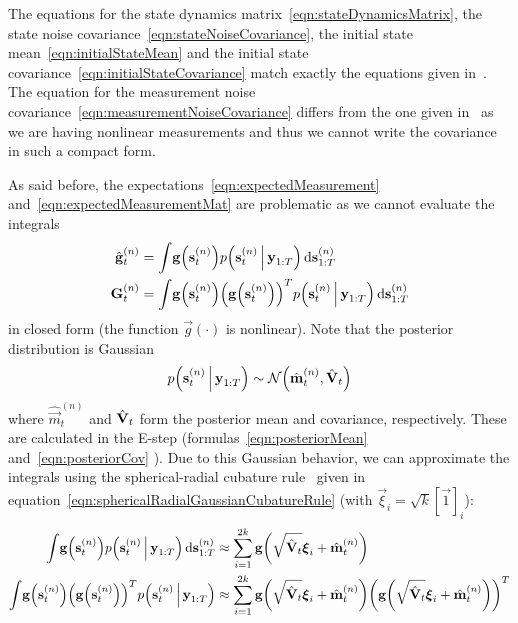 	The equations for the state dynamics matrix~\ref{eqn:stateDynamicsMatrix}, the state noise covariance~\ref{eqn:stateNoiseCovariance}, the initial state mean~\ref{eqn:initialStateMean} and the initial state covariance~\ref{eqn:initialStateCovariance} match exactly the equations given in~\cite{ghahramaniParameterEstimationLinear1996}. The equation for the measurement noise covariance~\ref{eqn:measurementNoiseCovariance} differs from the one given in~\cite{ghahramaniParameterEstimationLinear1996} as we are having nonlinear measurements and thus we cannot write the covariance in such a compact form.
	
	As said before, the expectations~\ref{eqn:expectedMeasurement} and~\ref{eqn:expectedMeasurementMat} are problematic as we cannot evaluate the integrals
	\begin{align*}
		\hat{\boldsymbol{\mathrm{g}}}_t^{(n)} &= \int\! \boldsymbol{\mathrm{g}}\Big(\boldsymbol{\mathrm{s}}_t^{(n)}\Big) p\Big(\boldsymbol{\mathrm{s}}_t^{(n)} \,\Big\vert\, \boldsymbol{\mathrm{y}}_{1:T}\Big) \dd{\boldsymbol{\mathrm{s}}_{1:T}^{(n)}} \\
		\boldsymbol{\mathrm{G}}_t^{(n)}       &= \int\! \boldsymbol{\mathrm{g}}\Big(\boldsymbol{\mathrm{s}}_t^{(n)}\Big) \Big(\boldsymbol{\mathrm{g}}\Big(\boldsymbol{\mathrm{s}}_t^{(n)}\Big)\Big)^T p\Big(\boldsymbol{\mathrm{s}}_t^{(n)} \,\Big\vert\, \boldsymbol{\mathrm{y}}_{1:T} \Big) \dd{\boldsymbol{\mathrm{s}}_{1:T}^{(n)}}
	\end{align*}
	in closed form (the function \( \vec{g}(\cdot) \) is nonlinear). Note that the posterior distribution is Gaussian
	\begin{equation*} %
		p\Big(\vec{s}_t^{(n)} \Biggiven \vec{y}_{1:T}\Big) \sim \normal\Big(\hat{\vec{m}}_t^{(n)}, \hat{\mat{V}}_t\Big)
	\end{equation*}
	where \( \hat{\vec{m}}_t^{(n)} \) and \( \hat{\boldsymbol{\mathrm{V}}}_t \) form the posterior mean and covariance, respectively. These are calculated in the E-step (formulas~\ref{eqn:posteriorMean} and~\ref{eqn:posteriorCov} ). Due to this Gaussian behavior, we can approximate the integrals using the spherical-radial cubature rule~\cite{solinCubatureIntegrationMethods2010} given in equation~\ref{eqn:sphericalRadialGaussianCubatureRule} (with \( \vec{\xi}_i = \sqrt{k} [\vec{1}]_i \)):
	\begin{align}
		\int\! \boldsymbol{\mathrm{g}}\Big(\boldsymbol{\mathrm{s}}_t^{(n)}\Big) p\Big(\boldsymbol{\mathrm{s}}_t^{(n)} \,\Big\vert\, \boldsymbol{\mathrm{y}}_{1:T}\Big) \dd{\boldsymbol{\mathrm{s}}_{1:T}^{(n)}}
			&\approx \sum_{i = 1}^{2k} \boldsymbol{\mathrm{g}}\bigg(\sqrt{\hat{\boldsymbol{\mathrm{V}}}_t} \boldsymbol{\mathrm{\xi}}_i + \hat{\boldsymbol{\mathrm{m}}}_t^{(n)}\bigg)  \label{eqn:lgsCubatureG} \\
		\int\! \boldsymbol{\mathrm{g}}\Big(\boldsymbol{\mathrm{s}}_t^{(n)}\Big) \Big(\boldsymbol{\mathrm{g}}\Big(\boldsymbol{\mathrm{s}}_t^{(n)}\Big)\Big)^T p\Big(\boldsymbol{\mathrm{s}}_t^{(n)} \,\Big\vert\, \boldsymbol{\mathrm{y}}_{1:T} \Big)
			&\approx \sum_{i = 1}^{2k} \boldsymbol{\mathrm{g}}\bigg(\sqrt{\hat{\boldsymbol{\mathrm{V}}}_t} \boldsymbol{\mathrm{\xi}}_i + \hat{\boldsymbol{\mathrm{m}}}_t^{(n)}\bigg) \bigg( \boldsymbol{\mathrm{g}}\bigg(\sqrt{\hat{\boldsymbol{\mathrm{V}}}_t} \boldsymbol{\mathrm{\xi}}_i + \hat{\boldsymbol{\mathrm{m}}}_t^{(n)}\bigg) \bigg)^T  \label{eqn:lgsCubatureGG}
	\end{align}
